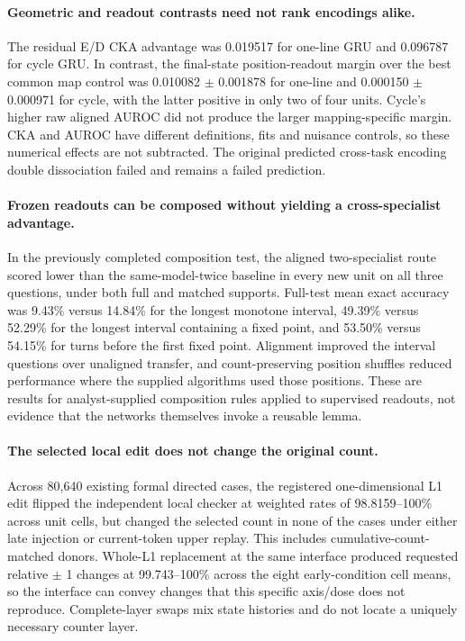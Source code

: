 \paragraph{Geometric and readout contrasts need not rank encodings alike.} The residual E/D CKA advantage was 0.019517 for one-line GRU and 0.096787 for cycle GRU. In contrast, the final-state position-readout margin over the best common map control was 0.010082  $\pm$  0.001878 for one-line and 0.000150  $\pm$  0.000971 for cycle, with the latter positive in only two of four units. Cycle's higher raw aligned AUROC did not produce the larger mapping-specific margin. CKA and AUROC have different definitions, fits and nuisance controls, so these numerical effects are not subtracted. The original predicted cross-task encoding double dissociation failed and remains a failed prediction.

\paragraph{Frozen readouts can be composed without yielding a cross-specialist advantage.} In the previously completed composition test, the aligned two-specialist route scored lower than the same-model-twice baseline in every new unit on all three questions, under both full and matched supports. Full-test mean exact accuracy was 9.43\% versus 14.84\% for the longest monotone interval, 49.39\% versus 52.29\% for the longest interval containing a fixed point, and 53.50\% versus 54.15\% for turns before the first fixed point. Alignment improved the interval questions over unaligned transfer, and count-preserving position shuffles reduced performance where the supplied algorithms used those positions. These are results for analyst-supplied composition rules applied to supervised readouts, not evidence that the networks themselves invoke a reusable lemma.

\paragraph{The selected local edit does not change the original count.} Across 80,640 existing formal directed cases, the registered one-dimensional L1 edit flipped the independent local checker at weighted rates of 98.8159--100\% across unit cells, but changed the selected count in none of the cases under either late injection or current-token upper replay. This includes cumulative-count-matched donors. Whole-L1 replacement at the same interface produced requested relative  $\pm$ 1 changes at 99.743--100\% across the eight early-condition cell means, so the interface can convey changes that this specific axis/dose does not reproduce. Complete-layer swaps mix state histories and do not locate a uniquely necessary counter layer.

